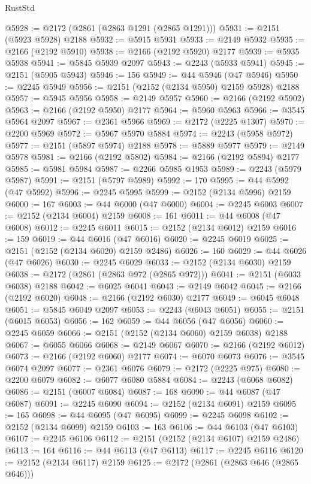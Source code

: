 \begin{lexlean}{RustStd}
\begin{coremodule}
@5928 := @2172 (@2861 (@2863 @1291 (@2865 @1291)))
@5931 := @2151 (@5923 @5928) @2188
@5932 := @5915 @5931
@5933 := @2149 @5932
@5935 := @2166 (@2192 @5910)
@5938 := @2166 (@2192 @5920) @2177
@5939 := @5935 @5938
@5941 := @5845 @5939 @2097
@5943 := @2243 (@5933 @5941)
@5945 := @2151 (@5905 @5943)
@5946 := 156
@5949 := @44 @5946 (@47 @5946)
@5950 := @2245 @5949
@5956 := @2151 (@2152 (@2134 @5950) @2159 @5928) @2188
@5957 := @5945 @5956
@5958 := @2149 @5957
@5960 := @2166 (@2192 @5902)
@5963 := @2166 (@2192 @5950) @2177
@5964 := @5960 @5963
@5966 := @3545 @5964 @2097
@5967 := @2361 @5966
@5969 := @2172 (@2225 @1307)
@5970 := @2200 @5969
@5972 := @5967 @5970 @5884
@5974 := @2243 (@5958 @5972)
@5977 := @2151 (@5897 @5974) @2188
@5978 := @5889 @5977
@5979 := @2149 @5978
@5981 := @2166 (@2192 @5802)
@5984 := @2166 (@2192 @5894) @2177
@5985 := @5981 @5984
@5987 := @2266 @5985 @1953
@5989 := @2243 (@5979 @5987)
@5991 := @2151 (@5797 @5989)
@5992 := 170
@5995 := @44 @5992 (@47 @5992)
@5996 := @2245 @5995
@5999 := @2152 (@2134 @5996) @2159
@6000 := 167
@6003 := @44 @6000 (@47 @6000)
@6004 := @2245 @6003
@6007 := @2152 (@2134 @6004) @2159
@6008 := 161
@6011 := @44 @6008 (@47 @6008)
@6012 := @2245 @6011
@6015 := @2152 (@2134 @6012) @2159
@6016 := 159
@6019 := @44 @6016 (@47 @6016)
@6020 := @2245 @6019
@6025 := @2151 (@2152 (@2134 @6020) @2159 @2486)
@6026 := 160
@6029 := @44 @6026 (@47 @6026)
@6030 := @2245 @6029
@6033 := @2152 (@2134 @6030) @2159
@6038 := @2172 (@2861 (@2863 @972 (@2865 @972)))
@6041 := @2151 (@6033 @6038) @2188
@6042 := @6025 @6041
@6043 := @2149 @6042
@6045 := @2166 (@2192 @6020)
@6048 := @2166 (@2192 @6030) @2177
@6049 := @6045 @6048
@6051 := @5845 @6049 @2097
@6053 := @2243 (@6043 @6051)
@6055 := @2151 (@6015 @6053)
@6056 := 162
@6059 := @44 @6056 (@47 @6056)
@6060 := @2245 @6059
@6066 := @2151 (@2152 (@2134 @6060) @2159 @6038) @2188
@6067 := @6055 @6066
@6068 := @2149 @6067
@6070 := @2166 (@2192 @6012)
@6073 := @2166 (@2192 @6060) @2177
@6074 := @6070 @6073
@6076 := @3545 @6074 @2097
@6077 := @2361 @6076
@6079 := @2172 (@2225 @975)
@6080 := @2200 @6079
@6082 := @6077 @6080 @5884
@6084 := @2243 (@6068 @6082)
@6086 := @2151 (@6007 @6084)
@6087 := 168
@6090 := @44 @6087 (@47 @6087)
@6091 := @2245 @6090
@6094 := @2152 (@2134 @6091) @2159
@6095 := 165
@6098 := @44 @6095 (@47 @6095)
@6099 := @2245 @6098
@6102 := @2152 (@2134 @6099) @2159
@6103 := 163
@6106 := @44 @6103 (@47 @6103)
@6107 := @2245 @6106
@6112 := @2151 (@2152 (@2134 @6107) @2159 @2486)
@6113 := 164
@6116 := @44 @6113 (@47 @6113)
@6117 := @2245 @6116
@6120 := @2152 (@2134 @6117) @2159
@6125 := @2172 (@2861 (@2863 @646 (@2865 @646)))

\end{coremodule}
\end{lexlean}
